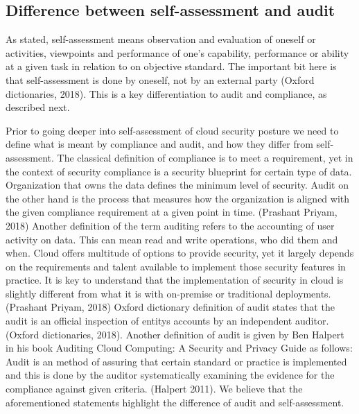 \documentclass{article}
\begin{document}
\subsection{Difference between self-assessment and audit}
As stated, self-assessment means observation and evaluation of oneself or activities, viewpoints and performance of one's capability, performance or ability at a given task in relation to on objective standard. The important bit here is that self-assessment is done by oneself, not by an external party (Oxford dictionaries, 2018). This is a key differentiation to audit and compliance, as described next.
\par
Prior to going deeper into self-assessment of cloud security posture we need to define what is meant by compliance and audit, and how they differ from self-assessment.
The classical definition of compliance is to meet a requirement, yet in the context of security compliance is a security blueprint for certain type of data. Organization that owns the data defines the minimum level of security.
Audit on the other hand is the process that measures how the organization is aligned with the given compliance requirement at a given point in time. (Prashant Priyam, 2018)
Another definition of the term auditing refers to the accounting of user activity on data. This can mean read and write operations, who did them and when.
Cloud offers multitude of options to provide security, yet it largely depends on the requirements and talent available to implement those security features in practice. It is key to understand that the implementation of security in cloud is slightly different from what it is with on-premise or traditional deployments. (Prashant Priyam, 2018)
Oxford dictionary definition of audit states that the audit is an official inspection of entitys accounts by an independent auditor. (Oxford dictionaries, 2018). Another definition of audit is given by Ben Halpert in his book Auditing Cloud Computing: A Security and Privacy Guide as follows: Audit is an method of assuring that certain standard or practice is implemented and this is done by the auditor systematically examining the evidence for the compliance against given criteria. (Halpert 2011). We believe that the aforementioned statements highlight the difference of audit and self-assessment. 
\end{document}
